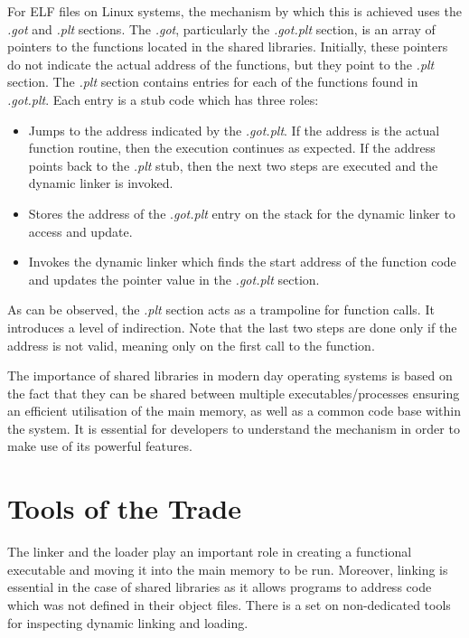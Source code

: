 For ELF files on Linux systems, the mechanism by which this is achieved uses the \textit{.got} and \textit{.plt} sections. The \textit{.got}, particularly the \textit{.got.plt} section, is an array of pointers to the functions located in the shared libraries. Initially, these pointers do not indicate the actual address of the functions, but they point to the \textit{.plt} section. The \textit{.plt} section contains entries for each of the functions found in \textit{.got.plt}. Each entry is a stub code which has three roles:
\begin{itemize}
\item Jumps to the address indicated by the \textit{.got.plt}. If the address is the actual function routine, then the execution continues as expected. If the address points back to the \textit{.plt} stub, then the next two steps are executed and the dynamic linker is invoked.
\item Stores the address of the .\textit{got.plt} entry on the stack for the dynamic linker to access and update.
\item Invokes the dynamic linker which finds the start address of the function code and updates the pointer value in the \textit{.got.plt} section.
\end{itemize}
As can be observed, the \textit{.plt} section acts as a trampoline for function calls. It introduces a level of indirection. Note that the last two steps are done only if the address is not valid, meaning only on the first call to the function.

The importance of shared libraries in modern day operating systems is based on the fact that they can be shared between multiple executables/processes ensuring an efficient utilisation of the main memory, as well as a common code base within the system. It is essential for developers to understand the mechanism in order to make use of its powerful features.

\section{Tools of the Trade}
\label{sec:tools-of-the-trade}

The linker and the loader play an important role in creating a functional executable and moving it into the main memory to be run. Moreover, linking is essential in the case of shared libraries as it allows programs to address code which was not defined in their object files. There is a set on non-dedicated tools for inspecting dynamic linking and loading.

